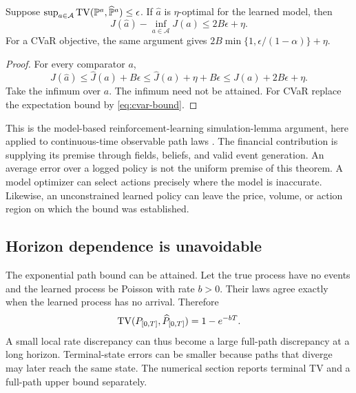 \begin{theorem}\label{thm:regret}
Suppose
$\sup_{a\in\mathcal A}\operatorname{TV}(\mathbb P^a,\widehat{\mathbb P}^a)\le\epsilon$.
If $\widehat a$ is $\eta$-optimal for the learned model, then
\begin{equation}\label{eq:regret}
 J(\widehat a)-\inf_{a\in\mathcal A}J(a)\le2B\epsilon+\eta.
\end{equation}
For a CVaR objective, the same argument gives
$2B\min\{1,\epsilon/(1-\alpha)\}+\eta$.
\end{theorem}
\begin{proof}
For every comparator $a$,
\[
 J(\widehat a)
 \le\widehat J(\widehat a)+B\epsilon
 \le\widehat J(a)+\eta+B\epsilon
 \le J(a)+2B\epsilon+\eta.
\]
Take the infimum over $a$. The infimum need not be attained. For CVaR replace the expectation bound by \eqref{eq:cvar-bound}.
\end{proof}

This is the model-based reinforcement-learning simulation-lemma argument, here applied to continuous-time observable path laws \citep{kearns2002}. The financial contribution is supplying its premise through fields, beliefs, and valid event generation. An average error over a logged policy is not the uniform premise of this theorem. A model optimizer can select actions precisely where the model is inaccurate. Likewise, an unconstrained learned policy can leave the price, volume, or action region on which the bound was established.

\subsection{Horizon dependence is unavoidable}
The exponential path bound can be attained. Let the true process have no events and the learned process be Poisson with rate $b>0$. Their laws agree exactly when the learned process has no arrival. Therefore
\[
 \operatorname{TV}(P_{[0,T]},\widehat P_{[0,T]})=1-e^{-bT}.
\]
A small local rate discrepancy can thus become a large full-path discrepancy at a long horizon. Terminal-state errors can be smaller because paths that diverge may later reach the same state. The numerical section reports terminal TV and a full-path upper bound separately.
